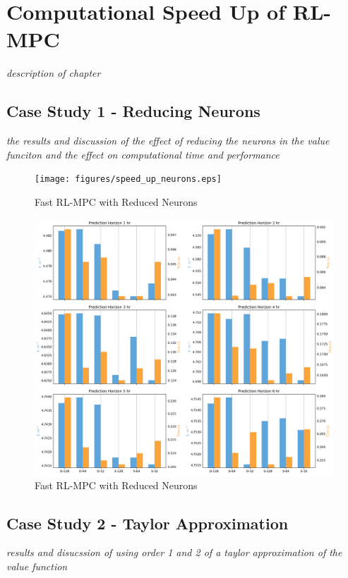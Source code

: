 \chapter{Computational Speed Up of RL-MPC}

\emph{description of chapter}

\section{Case Study 1 - Reducing Neurons}
\emph{the results and discussion of the effect of reducing the neurons in the value funciton and the effect on computational time and performance}


\begin{figure}[H]
	\centering
	\texttt{[image: figures/speed\_up\_neurons.eps]}
	\caption{Fast RL-MPC with Reduced Neurons}
	\label{fig:neurons-speedup}
\end{figure}

\begin{figure}[H]
	\centering
	\includegraphics[width=\textwidth]{figures/speed_up_neurons_bar_graph.png}
	\caption{Fast RL-MPC with Reduced Neurons}
	\label{fig:neurons-speedup-bar-graph}
\end{figure}

\section{Case Study 2 - Taylor Approximation}
\emph{results and disucssion of using order 1 and 2 of a taylor approximation of the value function}


